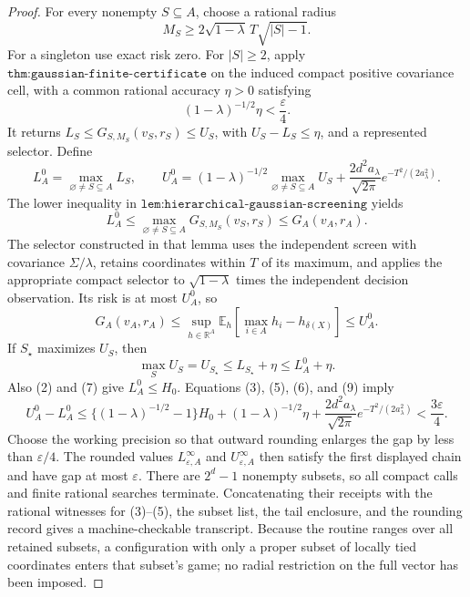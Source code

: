 \documentclass{article}
\begin{document}
\begin{proof}
For every nonempty \(S\subseteq A\), choose a rational radius
\[
M_S\geq2\sqrt{1-\lambda}\,T\sqrt{|S|-1}.                          \tag{4}
\]
For a singleton use exact risk zero.  For \(|S|\geq2\), apply \(\texttt{thm:gaussian-finite-certificate}\) on the induced compact positive covariance cell, with a common rational accuracy \(\eta>0\) satisfying
\[
(1-\lambda)^{-1/2}\eta<\frac\varepsilon4.                         \tag{5}
\]
It returns \(L_S\leq G_{S,M_S}(v_S,r_S)\leq U_S\), with \(U_S-L_S\leq\eta\), and a represented selector.  Define
\[
L_A^0=\max_{\varnothing\ne S\subseteq A}L_S,
\qquad
U_A^0=(1-\lambda)^{-1/2}\max_{\varnothing\ne S\subseteq A}U_S
+\frac{2d^2a_\lambda}{\sqrt{2\pi}}e^{-T^2/(2a_\lambda^2)}.       \tag{6}
\]
The lower inequality in \(\texttt{lem:hierarchical-gaussian-screening}\) yields
\[
L_A^0\leq\max_{\varnothing\ne S\subseteq A}G_{S,M_S}(v_S,r_S)
\leq G_A(v_A,r_A).                                                 \tag{7}
\]
The selector constructed in that lemma uses the independent screen with covariance \(\Sigma/\lambda\), retains coordinates within \(T\) of its maximum, and applies the appropriate compact selector to \(\sqrt{1-\lambda}\) times the independent decision observation.  Its risk is at most \(U_A^0\), so
\[
G_A(v_A,r_A)\leq
\sup_{h\in\mathbb R^A}\mathbb E_h\!\left[\max_{i\in A}h_i-h_{\delta(X)}\right]
\leq U_A^0.                                                        \tag{8}
\]
If \(S_\star\) maximizes \(U_S\), then
\[
\max_SU_S=U_{S_\star}\leq L_{S_\star}+\eta\leq L_A^0+\eta.      \tag{9}
\]
Also (2) and (7) give \(L_A^0\leq H_0\).  Equations (3), (5), (6), and (9) imply
\[
U_A^0-L_A^0
\leq\{(1-\lambda)^{-1/2}-1\}H_0+(1-\lambda)^{-1/2}\eta
+\frac{2d^2a_\lambda}{\sqrt{2\pi}}e^{-T^2/(2a_\lambda^2)}
<\frac{3\varepsilon}{4}.                                         \tag{10}
\]
Choose the working precision so that outward rounding enlarges the gap by less than \(\varepsilon/4\).  The rounded values \(L^\infty_{\varepsilon,A}\) and \(U^\infty_{\varepsilon,A}\) then satisfy the first displayed chain and have gap at most \(\varepsilon\).  There are \(2^d-1\) nonempty subsets, so all compact calls and finite rational searches terminate.  Concatenating their receipts with the rational witnesses for (3)--(5), the subset list, the tail enclosure, and the rounding record gives a machine-checkable transcript.  Because the routine ranges over all retained subsets, a configuration with only a proper subset of locally tied coordinates enters that subset's game; no radial restriction on the full vector has been imposed.


\end{proof}
\end{document}
